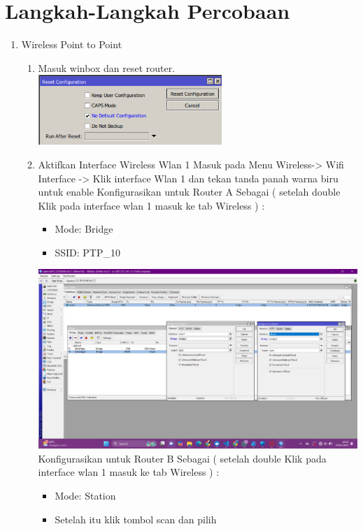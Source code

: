 \section{Langkah-Langkah Percobaan}
\begin{enumerate}
    \item Wireless Point to Point
    \begin{enumerate}
        \item Masuk winbox dan reset router. \newline
        \includegraphics[scale=2]{P1/img/1.png}
        \item Aktifkan Interface Wireless Wlan 1 Masuk pada Menu 
        Wireless-> Wifi Interface -> Klik interface Wlan 1 dan 
        tekan tanda panah warna biru untuk enable Konfigurasikan 
        untuk Router A Sebagai ( setelah double Klik pada 
        interface wlan 1 masuk ke tab Wireless ) :
        \begin{itemize}
            \item Mode: Bridge
            \item SSID: PTP\_10
        \end{itemize}
        \includegraphics[scale=0.4]{P1/img/4.jpg} \newline
        Konfigurasikan untuk Router B Sebagai ( setelah double 
        Klik pada interface wlan 1 masuk ke tab Wireless ) :
        \begin{itemize}
            \item Mode: Station
            \item Setelah itu klik tombol scan dan pilih 

\end{itemize}
\end{enumerate}
\end{enumerate}

